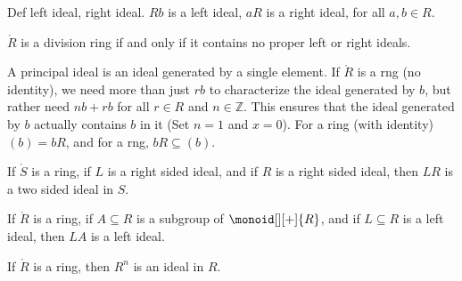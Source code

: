 \documentclass{article}                                                        %
\begin{document}
                Def left ideal, right ideal. $Rb$ is a left ideal,
                $aR$ is a right ideal, for all $a,b\in{R}$.
                \begin{theorem}
                    $\ring{R}$ is a division ring if and only if it contains no
                    proper left or right ideals.
                \end{theorem}
                A principal ideal is an ideal generated by a single element. If
                $\ring{R}$ is a rng (no identity), we need more than just
                $rb$ to characterize the ideal generated by $b$, but rather
                need $nb+rb$ for all $r\in{R}$ and $n\in\mathbb{Z}$. This
                ensures that the ideal generated by $b$ actually contains $b$ in
                it (Set $n=1$ and $x=0$). For a ring (with identity)
                $(b)=bR$, and for a rng, $bR\subseteq(b)$.
                \begin{theorem}
                    If $\ring{S}$ is a ring, if $L$ is a right sided ideal,
                    and if $R$ is a right sided ideal, then $LR$ is a two sided
                    ideal in $S$.
                \end{theorem}
                \begin{theorem}
                    If $\ring{R}$ is a ring, if $A\subseteq{R}$ is a subgroup of
                    $\monoid[][+]{R}$, and if $L\subseteq{R}$ is a left ideal,
                    then $LA$ is a left ideal.
                \end{theorem}
                \begin{theorem}
                    If $\ring{R}$ is a ring, then $R^{n}$ is an ideal in $R$.
                \end{theorem}
\end{document}
